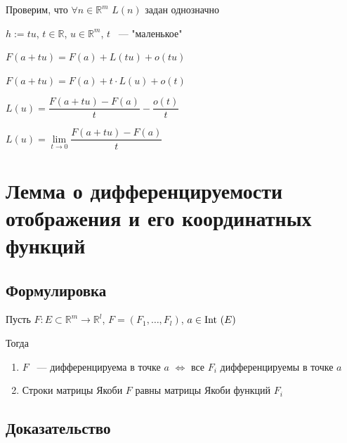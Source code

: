 \documentclass{article}
\begin{document}
            Проверим, что $\forall n \in \mathbb{R}^m$ $L(n)$ задан однозначно
            
            $h := tu$, $t \in \mathbb{R}$, $u \in \mathbb{R}^m$, $t$ ~--- "маленькое"
            
            $F(a + tu) = F(a) + L(tu) + o(tu)$
            
            $F(a + tu) = F(a) + t \cdot L(u) + o(t)$
            
            $L(u) = \dfrac{F(a + tu) - F(a)}{t} - \dfrac{o(t)}{t}$
            
            $L(u) = \lim\limits_{t \rightarrow 0} \dfrac{F(a + tu) - F(a)}{t}$
            
    \newpage
    
    \section{Лемма о дифференцируемости отображения и его координатных функций}
    
        \subsection{Формулировка}
        
            Пусть $F : E \subset \mathbb{R}^m \rightarrow \mathbb{R}^l$, $F = (F_1, \ldots, F_l)$, $a \in \Int (E)$
        
            Тогда 
            
                \begin{enumerate}
                
                    \item $F$ ~--- дифференцируема в точке $a$ $\Leftrightarrow$ все $F_i$ дифференцируемы в точке $a$
                    
                    \item Строки матрицы Якоби $F$ равны матрицы Якоби функций $F_i$
                
                \end{enumerate}
            
        \subsection{Доказательство}
        
\end{document}
